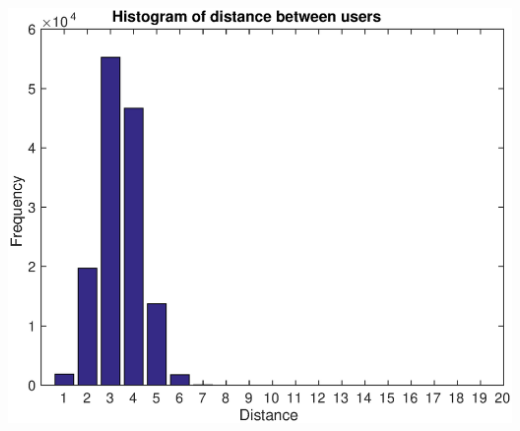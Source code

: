 \documentclass[11pt,a4paper,oneside]{report}
\begin{document}
\includegraphics[scale=0.6]{plots/206_histogram}
\end{document}
